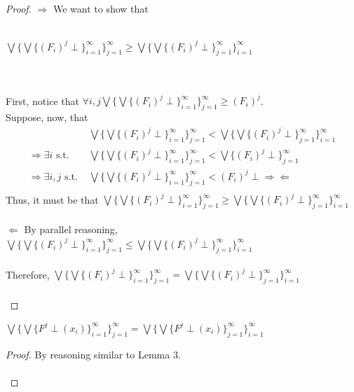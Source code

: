  \begin{proof}
 $\Rightarrow$ We want to show that\\ \\ \centerline{$\bigvee\{\bigvee\{(F_i)^j \perp\}^{\infty}_{i=1}\}^{\infty}
 _{j=1} \geq  \bigvee\{\bigvee\{(F_i)^j \perp\}^{\infty}_{j=1}\}^{\infty}_{i=1}$} \\ \\ First, notice that $\forall i, j \bigvee\{\bigvee
 \{(F_i)^j \perp\}^{\infty}_{i=1}\}^{\infty}_{j=1} \geq (F_i)^j$. \\
 Suppose, now, that 
 \begin{align*}
 &\bigvee\{\bigvee\{(F_i)^j \perp\}^{\infty}_{i=1}\}^{\infty}_{j=1} < \bigvee\{\bigvee\{(F_i)^j \perp\}^{\infty}_{j=1}\}^{\infty}_{i=1}\\ 
 \Rightarrow \exists i \text{ s.t. \ \  \ } &\bigvee\{\bigvee\{(F_i)^j \perp\}^{\infty}_{i=1}\}^{\infty}_{j=1} < \bigvee\{(F_i)^j \perp\}
 ^{\infty}_{j=1}\\
 \Rightarrow \exists i, j \text{ s.t. } &\bigvee\{\bigvee\{(F_i)^j \perp\}^{\infty}_{i=1}\}^{\infty}_{j=1} < (F_i)^j \perp 
 \Rightarrow\Leftarrow\\
 \end{align*}
 Thus, it must be that $\bigvee\{\bigvee\{(F_i)^j \perp\}^{\infty}_{i=1}\}^{\infty}_{j=1} \geq  \bigvee\{\bigvee\{(F_i)^j \perp\}^{\infty}
 _{j=1}\}^{\infty}_{i=1}$ \\ \\
 $\Leftarrow$ By parallel reasoning, $\bigvee\{\bigvee\{(F_i)^j \perp\}^{\infty}_{i=1}\}^{\infty}_{j=1} \leq  \bigvee\{\bigvee\{(F_i)^j 
 \perp\}^{\infty}_{j=1}\}^{\infty}_{i=1}$ \\ \\
 Therefore, $\bigvee\{\bigvee\{(F_i)^j \perp\}^{\infty}_{i=1}\}^{\infty}_{j=1} = \bigvee\{\bigvee\{(F_i)^j \perp\}^{\infty}_{j=1}\}
 ^{\infty}_{i=1}$ \\ \\
 \end{proof}

 \begin{lemma}
 $\bigvee\{\bigvee\{F^j \perp(x_i)\}^{\infty}_{i=1}\}^{\infty}_{j=1} = \bigvee\{\bigvee\{F^j \perp(x_i)\}^{\infty}
 _{j=1}\}^{\infty}_{i=1}$\\ 
 \end{lemma}

 \begin{proof} 
 By reasoning similar to Lemma 3. \\ \\
 \end{proof}
 
